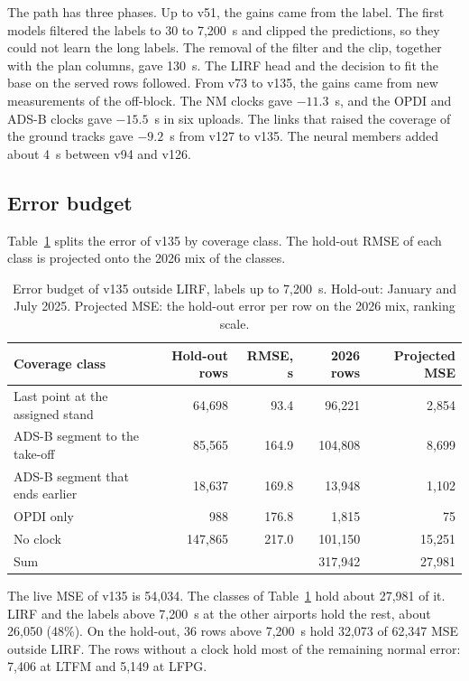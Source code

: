 \documentclass[
  manuscript=article,
  layout=preprint,
  year=2026,
  volume=x,
]{extra/joas}
\begin{document}
The path has three phases. Up to v51, the gains came from the label. The first models filtered the labels to 30 to 7,200~s and clipped the predictions, so they could not learn the long labels. The removal of the filter and the clip, together with the plan columns, gave 130~s. The LIRF head and the decision to fit the base on the served rows followed. From v73 to v135, the gains came from new measurements of the off-block. The NM clocks gave $-11.3$~s, and the OPDI and ADS-B clocks gave $-15.5$~s in six uploads. The links that raised the coverage of the ground tracks gave $-9.2$~s from v127 to v135. The neural members added about 4~s between v94 and v126.

\subsection{Error budget}

Table~\ref{tb:budget} splits the error of v135 by coverage class. The hold-out RMSE of each class is projected onto the 2026 mix of the classes.

\begin{table}[htbp!]
  \centering
  \small
  \caption{Error budget of v135 outside LIRF, labels up to 7,200~s. Hold-out: January and July 2025. Projected MSE: the hold-out error per row on the 2026 mix, ranking scale.}
  \label{tb:budget}
  \begin{tabular}{lrrrr}
  \toprule
  \textbf{Coverage class} & \textbf{Hold-out rows} & \textbf{RMSE, s} & \textbf{2026 rows} & \textbf{Projected MSE} \\
  \midrule
  Last point at the assigned stand & 64,698 & 93.4 & 96,221 & 2,854 \\
  ADS-B segment to the take-off & 85,565 & 164.9 & 104,808 & 8,699 \\
  ADS-B segment that ends earlier & 18,637 & 169.8 & 13,948 & 1,102 \\
  OPDI only & 988 & 176.8 & 1,815 & 75 \\
  No clock & 147,865 & 217.0 & 101,150 & 15,251 \\
  \midrule
  Sum & & & 317,942 & 27,981 \\
  \bottomrule
  \end{tabular}
\end{table}

The live MSE of v135 is 54,034. The classes of Table~\ref{tb:budget} hold about 27,981 of it. LIRF and the labels above 7,200~s at the other airports hold the rest, about 26,050 (48\%). On the hold-out, 36 rows above 7,200~s hold 32,073 of 62,347 MSE outside LIRF. The rows without a clock hold most of the remaining normal error: 7,406 at LTFM and 5,149 at LFPG.
\end{document}
